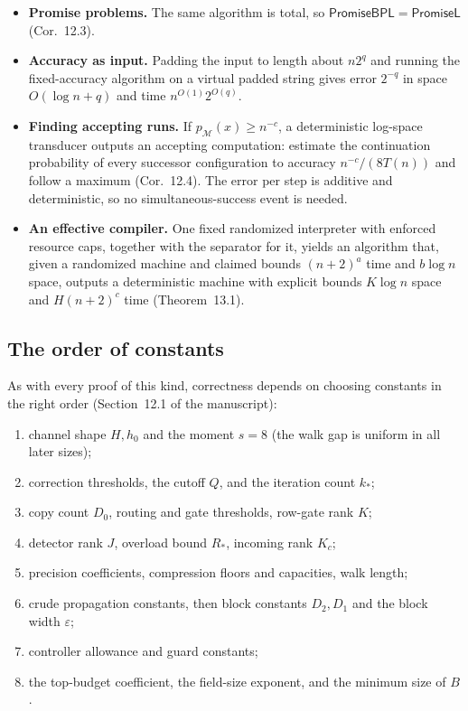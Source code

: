 \documentclass[11pt]{article}
\theoremstyle{definition}
\theoremstyle{remark}
\newcommand{\eps}{\varepsilon}
\begin{document}
\begin{itemize}
\item \textbf{Promise problems.} The same algorithm is total, so
  $\mathsf{PromiseBPL}=\mathsf{PromiseL}$ (Cor.~12.3).
\item \textbf{Accuracy as input.} Padding the input to length about $n2^q$
  and running the fixed-accuracy algorithm on a virtual padded string gives error
  $2^{-q}$ in space $O(\log n+q)$ and time $n^{O(1)}2^{O(q)}$.
\item \textbf{Finding accepting runs.} If $p_{\mathcal M}(x)\ge n^{-c}$, a
  deterministic log-space transducer outputs an accepting computation: estimate
  the continuation probability of every successor configuration to accuracy
  $n^{-c}/(8T(n))$ and follow a maximum (Cor.~12.4). The error per step is
  additive and deterministic, so no simultaneous-success event is needed.
\item \textbf{An effective compiler.} One fixed randomized interpreter with
  enforced resource caps, together with the separator for it, yields an algorithm
  that, given a randomized machine and claimed bounds $(n+2)^a$ time and
  $b\log n$ space, outputs a deterministic machine with explicit bounds
  $K\log n$ space and $H(n+2)^c$ time (Theorem~13.1).
\end{itemize}

\subsection{The order of constants}

As with every proof of this kind, correctness depends on choosing constants in
the right order (Section~12.1 of the manuscript):
\begin{enumerate}
\item channel shape $H,h_0$ and the moment $s=8$ (the walk gap is uniform in all later sizes);
\item correction thresholds, the cutoff $Q$, and the iteration count $k_*$;
\item copy count $D_0$, routing and gate thresholds, row-gate rank $K$;
\item detector rank $J$, overload bound $R_*$, incoming rank $K_c$;
\item precision coefficients, compression floors and capacities, walk length;
\item crude propagation constants, then block constants $D_2,D_1$ and the block width $\eps$;
\item controller allowance and guard constants;
\item the top-budget coefficient, the field-size exponent, and the minimum size of $B$.
\end{enumerate}
\end{document}
